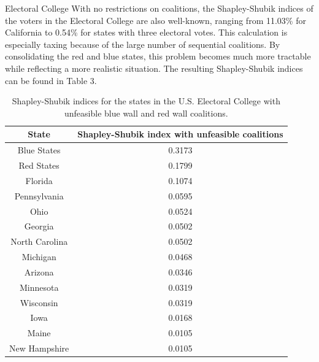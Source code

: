 \documentclass[11pt]{amsart}
\theoremstyle{plain}
\theoremstyle{definition}
\theoremstyle{remark}
\begin{document}
\begin{subsubsection}{Electoral College}\label{SSS:ECSS}
With no restrictions on coalitions, the Shapley-Shubik indices of the voters in the Electoral College are also well-known, ranging from 11.03\% for California to 0.54\% for states with three electoral votes.  This calculation is especially taxing because of the large number of sequential coalitions. By consolidating the red and blue states, this problem becomes much more tractable while reflecting a more realistic situation. The resulting Shapley-Shubik indices can be found in Table 3.

\begin{table}\label{T:ECSS}
\begin{center}
\begin{tabular}{| c | c|}
\hline
State & Shapley-Shubik index  with unfeasible coalitions\\
\hline
\hline
Blue States & 0.3173\\
\hline
Red States & 0.1799\\
\hline
Florida & 0.1074\\
\hline
Pennsylvania & 0.0595\\
\hline
Ohio & 0.0524\\
\hline
Georgia & 0.0502\\
\hline
North Carolina & 0.0502\\
\hline
Michigan & 0.0468\\
\hline
Arizona & 0.0346\\
\hline
Minnesota & 0.0319\\
\hline
Wisconsin & 0.0319\\
\hline
Iowa & 0.0168\\
\hline
Maine & 0.0105\\ 
\hline
New Hampshire & 0.0105 \\
\hline

\end{tabular}
\end{center}
\caption{Shapley-Shubik indices for the states in the U.S. Electoral College with unfeasible blue wall and red wall coalitions.}
\end{table}

\end{subsubsection}
\end{document}
